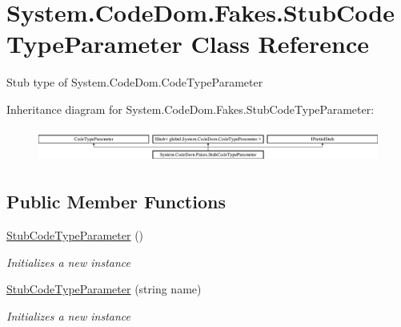 \hypertarget{class_system_1_1_code_dom_1_1_fakes_1_1_stub_code_type_parameter}{\section{System.\-Code\-Dom.\-Fakes.\-Stub\-Code\-Type\-Parameter Class Reference}
\label{class_system_1_1_code_dom_1_1_fakes_1_1_stub_code_type_parameter}
}


Stub type of System.\-Code\-Dom.\-Code\-Type\-Parameter 


Inheritance diagram for System.\-Code\-Dom.\-Fakes.\-Stub\-Code\-Type\-Parameter\-:\begin{figure}[H]
\begin{center}
\leavevmode
\includegraphics[height=1.134752cm]{class_system_1_1_code_dom_1_1_fakes_1_1_stub_code_type_parameter}
\end{center}
\end{figure}
\subsection*{Public Member Functions}
\begin{DoxyCompactItemize}
\item 
\hyperlink{class_system_1_1_code_dom_1_1_fakes_1_1_stub_code_type_parameter_a31b85724ebfaa18ece60f2e8711ed7da}{Stub\-Code\-Type\-Parameter} ()
\begin{DoxyCompactList}\small\item\em Initializes a new instance\end{DoxyCompactList}\item 
\hyperlink{class_system_1_1_code_dom_1_1_fakes_1_1_stub_code_type_parameter_af40aabe2033f237c0c740596b8bf3f96}{Stub\-Code\-Type\-Parameter} (string name)
\begin{DoxyCompactList}\small\item\em Initializes a new instance\end{DoxyCompactList}\end{DoxyCompactItemize}
